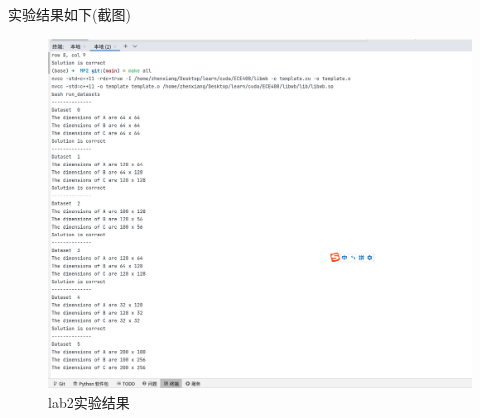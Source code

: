 \documentclass[11pt]{ctexart}
\begin{document}
实验结果如下(截图)
\begin{figure}[ht]
	\centering
	\includegraphics[width=1.0\textwidth]{photos/Lab2.png}
	\caption{lab2实验结果}
	\label{fig:1}
\end{figure}
\end{document}

